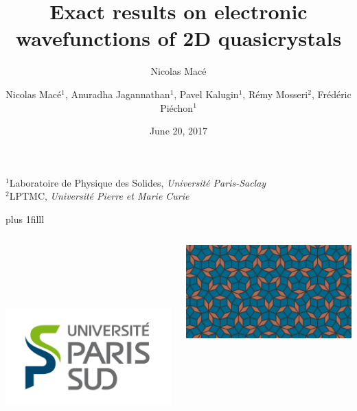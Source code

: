 \documentclass[xcolor=x11names,compress,professionalfonts, aspectratio=169]{beamer}
\author{Nicolas Macé}
\newcommand{\btVFill}{\vskip0pt plus 1filll}%
\renewcommand{\(}{\begin{columns}}
\renewcommand{\)}{\end{columns}}
\newcommand{\<}[1]{\begin{column}{#1}}
\renewcommand{\>}{\end{column}}
\begin{document}
\begin{frame}
\title{{\fontsize{14}{60}\selectfont Exact results on electronic wavefunctions of 2D quasicrystals}}

\author{{\fontsize{10}{60}\selectfont Nicolas Macé$^1$, Anuradha Jagannathan$^1$, Pavel Kalugin$^1$, Rémy Mosseri$^2$, Frédéric Piéchon$^1$}}

\institute %
{
  $^1$Laboratoire de Physique des Solides, \emph{Université Paris-Saclay} \\
  $^2$LPTMC, \emph{Université Pierre et Marie Curie}
}

\date{June 20, 2017}

\titlepage

\btVFill
\begin{columns}
\begin{column}{2cm}
~\\
~\\
~\\
~\\
\raggedright
\includegraphics[scale=.15]{img/LogoUPSUD.png}
\end{column}
\begin{column}{6cm}
\centering
\includegraphics[width=.8\textwidth]{img/cover.png}

\end{column}
\end{columns}
\end{frame}
\end{document}
